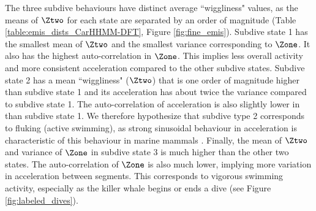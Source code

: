 The three subdive behaviours have distinct average ``wiggliness" values, as the means of $\Ztwo$ for each state are separated by an order of magnitude (Table \ref{table:emis_dists_CarHHMM-DFT}, Figure \ref{fig:fine_emis}). 
Subdive state 1 has the smallest mean of $\Ztwo$ and the smallest variance corresponding to $\Zone$. It also has the highest auto-correlation in $\Zone$. This implies less overall activity and more consistent acceleration compared to the other subdive states. 
Subdive state 2 has a mean ``wiggliness" ($\Ztwo$) that is one order of magnitude higher than subdive state 1 and its acceleration has about twice the variance compared to subdive state 1. The auto-correlation of acceleration is also slightly lower in than subdive state 1. We therefore hypothesize that subdive type 2 corresponds to fluking (active swimming), as strong sinusoidal behaviour in acceleration is characteristic of this behaviour in marine mammals \citep{Simon:2012}.
Finally, the mean of $\Ztwo$ and variance of $\Zone$ in subdive state 3 is much higher than the other two states. The auto-correlation of $\Zone$ is also much lower, implying more variation in acceleration between segments. This corresponds to vigorous swimming activity, especially as the killer whale begins or ends a dive (see Figure \ref{fig:labeled_dives}). 

